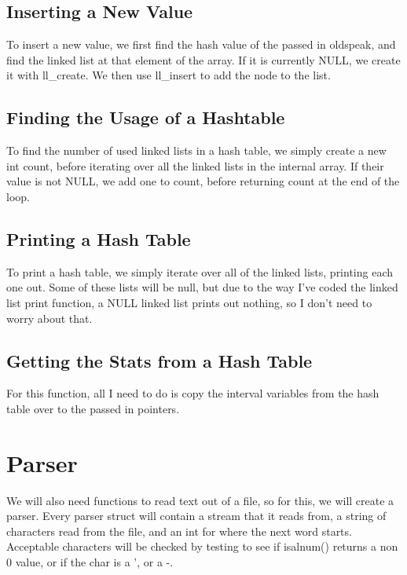 \documentclass[11pt]{article}
\begin{document}
\subsection{Inserting a New Value}

To insert a new value, we first find the hash value of the passed in oldspeak, and find the linked list at that element of the array. If it is currently NULL, we create it with ll\_create. We then use ll\_insert to add the node to the list.

\subsection{Finding the Usage of a Hashtable}

To find the number of used linked lists in a hash table, we simply create a new int count, before iterating over all the linked lists in the internal array. If their value is not NULL, we add one to count, before returning count at the end of the loop.

\subsection{Printing a Hash Table}

To print a hash table, we simply iterate over all of the linked lists, printing each one out. Some of these lists will be null, but due to the way I've coded the linked list print function, a NULL linked list prints out nothing, so I don't need to worry about that.

\subsection{Getting the Stats from a Hash Table}

For this function, all I need to do is copy the interval variables from the hash table over to the passed in pointers.

\section{Parser}

We will also need functions to read text out of a file, so for this, we will create a parser. Every parser struct will contain a stream that it reads from, a string of characters read from the file, and an int for where the next word starts. Acceptable characters will be checked by testing to see if isalnum() returns a non 0 value, or if the char is a ', or a -.
\end{document}
